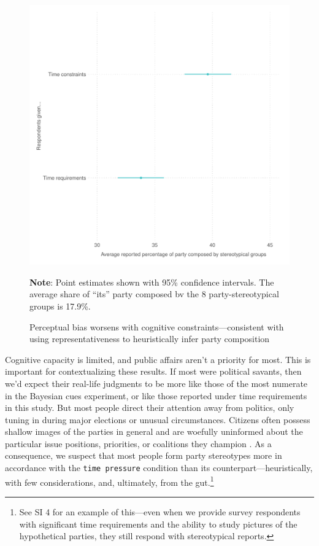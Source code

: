 \documentclass[12pt, letterpaper]{article}
\begin{document}
\begin{figure}
\caption{Perceptual bias worsens with cognitive constraints---consistent with using representativeness to heuristically infer party composition}
\label{fig:timing}
\begin{center}
\includegraphics[width=1\textwidth]{../figs/timing.pdf}
\end{center}
\scriptsize{\textbf{Note}: Point estimates shown with 95\% confidence intervals. The average share of ``its'' party composed bv the 8 party-stereotypical groups is 17.9\%.}
\end{figure}

Cognitive capacity is limited, and public affairs aren't a priority for most. This is important for contextualizing these results. If most were political savants, then we'd expect their real-life judgments to be more like those of the most numerate in the Bayesian cues experiment, or like those reported under time requirements in this study. But most people direct their attention away from politics, only tuning in during major elections or unusual circumstances. Citizens often possess shallow images of the parties in general \citep{BullockEtAl2015, Converse1964, dancey2016inferences, DelliCarpiniKeeter1995, KuklinskiEtAl2000} and are woefully uninformed about the particular issue positions, priorities, or coalitions they champion \citep{Levendusky2010, Zaller1992}. As a consequence, we suspect that most people form party stereotypes more in accordance with the {\tt time pressure} condition than its counterpart---heuristically, with few considerations, and, ultimately, from the gut.\footnote{See SI 4 for an example of this---even when we provide survey respondents with significant time requirements and the ability to study pictures of the hypothetical parties, they still respond with stereotypical reports.}
\end{document}
